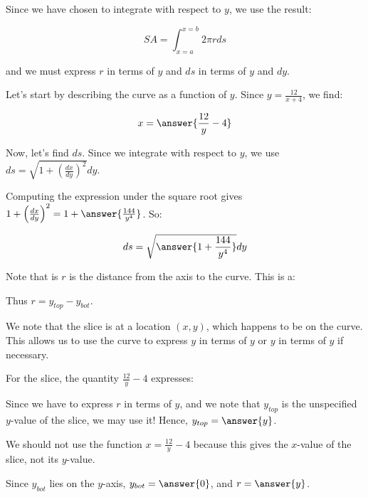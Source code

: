 \documentclass{ximera}
\begin{document}
\begin{exercise}
Since we have chosen to integrate with respect to $y$, we use the result:

\[ SA = \int_{x=a}^{x=b} 2 \pi r ds\]

and we must express $r$ in terms of $y$ and $ds$ in terms of $y$ and $dy$.  


Let's start by describing the curve as a function of $y$.  Since $y=\frac{12}{x+4}$, we find:

\[
x= \answer{\frac{12}{y}-4}
\]

Now, let's find $ds$.  Since we integrate with respect to $y$, we use $ds = \sqrt{1+\left(\frac{dx}{dy}\right)^2} dy$.

Computing the expression under the square root gives $1+\left(\frac{dx}{dy}\right)^2 = 1+\answer{\frac{144}{y^4}}$.  So: 

\[
ds = \sqrt{\answer{1+\frac{144}{y^4}}} dy
\]


\begin{exercise}
Note that is $r$ is the distance from the axis to the curve. This is a:

\begin{multipleChoice}
\end{multipleChoice} 
Thus $r=y_{top}-y_{bot}$.  

We note that the slice is at a location $(x,y)$, which happens to be on the curve.  This allows us to use the curve to express $y$ in terms of $y$ or $y$ in terms of $y$ if necessary.  

For the slice, the quantity $\frac{12}{y}-4$ expresses:
\begin{multipleChoice}
\end{multipleChoice} 

Since we have to express $r$ in terms of $y$, and we note that $y_{top}$ is the unspecified $y$-value of the slice, we may use it!  Hence, $y_{top} = \answer{y}$.

\begin{feedback}
We should not use the function $x=\frac{12}{y}-4$ because this gives the $x$-value of the slice, not its $y$-value.
\end{feedback}

Since $y_{bot}$ lies on the $y$-axis, $y_{bot} = \answer{0}$, and $r= \answer{y}$.

\end{exercise}


\end{exercise}
\end{document}
